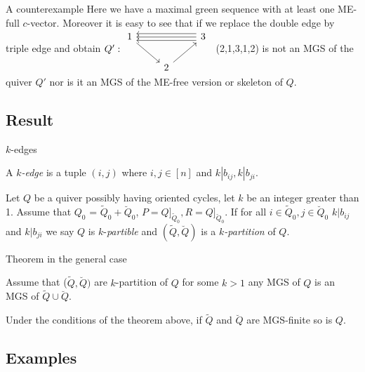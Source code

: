 \documentclass{beamer}
\newcommand{\lefttwicetriplearrow}{\arrow[ll, shift right=0.8ex]\arrow[ll]\arrow[ll, shift left=0.8ex]}
\begin{document}
\begin{frame}[fragile]{A counterexample}
\indent Here we have a maximal green sequence with at least one ME-full $c$-vector. Moreover it is easy to see that if we replace the double edge by triple edge and obtain $Q': \begin{tikzcd}
1\arrow[rd] &  & 3\lefttwicetriplearrow\\
 & 2\arrow[ur]
\end{tikzcd}$\ (2,1,3,1,2) is not an MGS of the quiver $Q'$ nor is it an MGS of the ME-free version or skeleton of $Q$.\\
\end{frame}

\subsection{Result}

\begin{frame}{$k$-edges}
\begin{definition}
A $k$\textit{-edge} is a tuple $(i,j)$ where $i,j\in [n]$ and $k|b_{ij}, k|b_{ji}$.
\end{definition}
\begin{definition}
Let $Q$ be a quiver possibly having oriented cycles, let $k$ be an integer greater than 1. Assume that $Q_0$ = $\tilde{Q}_0 + \breve{Q}_0$, $P = Q]_{\tilde{Q}_0}, R = Q]_{\breve{Q}_0}$. If for all $i\in \tilde{Q}_0, j\in  \breve{Q}_0$ $k|b_{ij}$ and $k|b_{ji}$ we say $Q$ is $k$-\textit{partible} and $(\tilde{Q}, \breve{Q})$ is a $k$\textit{-partition} of $Q$.
\end{definition}
\end{frame}

\begin{frame}{Theorem in the general case}
\begin{theorem}
Assume that ($\tilde{Q},\breve{Q})$ are $k$-partition of $Q$ for some $k>1$ any MGS of $Q$ is an MGS of $\tilde{Q}\cup\breve{Q}$.\label{T2B}
\end{theorem}\pause
\begin{corollary}
Under the conditions of the theorem above, if $\tilde{Q}$ and $\breve{Q}$ are MGS-finite so is $Q$.
\end{corollary}
\end{frame}

\subsection{Examples}
\end{document}
